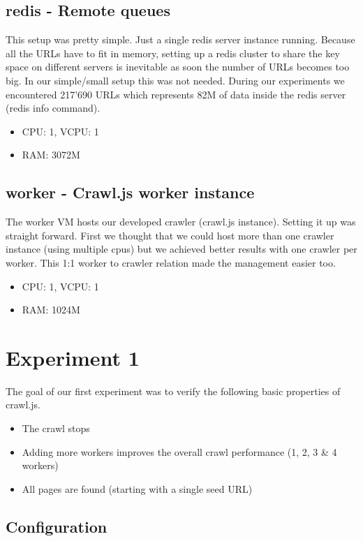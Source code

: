 \subsection{redis - Remote queues}
This setup was pretty simple. Just a single redis server instance running. Because all the URLs have to fit in memory, setting up a redis cluster to share the key space on different servers is inevitable as soon the number of URLs becomes too big. In our simple/small setup this was not needed. During our experiments we encountered 217'690 URLs which represents 82M of data inside the redis server (redis info command).

\begin{itemize}
  \item CPU: 1, VCPU: 1
  \item RAM: 3072M
\end{itemize}

\subsection{worker - Crawl.js worker instance}
The worker VM hosts our developed crawler (crawl.js instance). Setting it up was straight forward. First we thought that we could host more than one crawler instance (using multiple cpus) but we achieved better results with one crawler per worker. This 1:1 worker to crawler relation made the management easier too.

\begin{itemize}
  \item CPU: 1, VCPU: 1
  \item RAM: 1024M
\end{itemize}

\section{Experiment 1}

The goal of our first experiment was to verify the following basic properties of crawl.js.

\begin{itemize}
  \item The crawl stops
  \item Adding more workers improves the overall crawl performance (1, 2, 3 \& 4 workers)
  \item All pages are found (starting with a single seed URL)
\end{itemize}

\subsection{Configuration}

